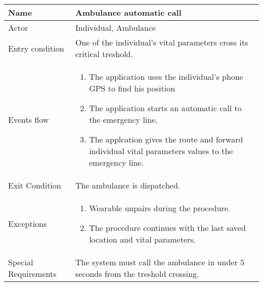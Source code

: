 \begin{tabular}{|l|p{13cm}|}
    \hline
    Name & Ambulance automatic call
    \\ \hline
    Actor & Individual, Ambulance
    \\ \hline 
    Entry condition & One of the individual's vital parameters cross its critical treshold.
        \\ \hline
    Events flow &
    \begin{enumerate}
    \item The application uses the individual's phone GPS to find his position
	\item The application starts an automatic call to the emergency line.
	\item The applcation gives the route and forward individual vital parameters values to the emergency line.
    \end{enumerate}
     \\ \hline
     Exit Condition & The ambulance is dispatched.
     \\
    \hline
    Exceptions &
        \begin{enumerate}
    \item Wearable unpairs during the procedure.
    \item The procedure continues with the last saved location and vital parameters.
    \end{enumerate}
      \\
      \hline
    Special Requirements & The system must call the ambulance in under 5 seconds from the treshold crossing.
      \\
      \hline
\end{tabular}



